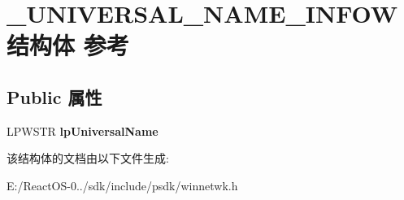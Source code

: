 \hypertarget{struct___u_n_i_v_e_r_s_a_l___n_a_m_e___i_n_f_o_w}{}\section{\+\_\+\+U\+N\+I\+V\+E\+R\+S\+A\+L\+\_\+\+N\+A\+M\+E\+\_\+\+I\+N\+F\+O\+W结构体 参考}
\label{struct___u_n_i_v_e_r_s_a_l___n_a_m_e___i_n_f_o_w}
\subsection*{Public 属性}
\begin{DoxyCompactItemize}
\item 
\mbox{\label{struct___u_n_i_v_e_r_s_a_l___n_a_m_e___i_n_f_o_w_a807c7a719dba422410c0c388498774ae}} 
L\+P\+W\+S\+TR {\bfseries lp\+Universal\+Name}
\end{DoxyCompactItemize}


该结构体的文档由以下文件生成\+:\begin{DoxyCompactItemize}
\item 
E\+:/\+React\+O\+S-\/0../sdk/include/psdk/winnetwk.\+h\end{DoxyCompactItemize}
